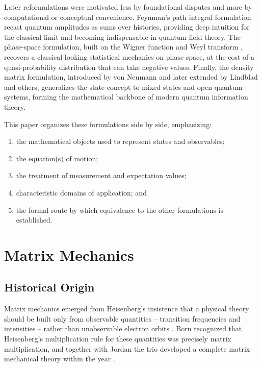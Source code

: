 \documentclass[11pt,a4paper]{article}
\begin{document}
Later reformulations were motivated less by foundational disputes and more by computational or conceptual convenience. Feynman's path integral formulation \citep{feynman1948} recast quantum amplitudes as sums over histories, providing deep intuition for the classical limit and becoming indispensable in quantum field theory. The phase-space formulation, built on the Wigner function \citep{wigner1932} and Weyl transform \citep{weyl1927}, recovers a classical-looking statistical mechanics on phase space, at the cost of a quasi-probability distribution that can take negative values. Finally, the density matrix formulation, introduced by von Neumann and later extended by Lindblad and others, generalizes the state concept to mixed states and open quantum systems, forming the mathematical backbone of modern quantum information theory.

This paper organizes these formulations side by side, emphasizing:
\begin{enumerate}[label=(\roman*)]
    \item the mathematical objects used to represent states and observables;
    \item the equation(s) of motion;
    \item the treatment of measurement and expectation values;
    \item characteristic domains of application; and
    \item the formal route by which equivalence to the other formulations is established.
\end{enumerate}

\section{Matrix Mechanics}

\subsection{Historical Origin}

Matrix mechanics emerged from Heisenberg's insistence that a physical theory should be built only from observable quantities -- transition frequencies and intensities -- rather than unobservable electron orbits \citep{heisenberg1925}. Born recognized that Heisenberg's multiplication rule for these quantities was precisely matrix multiplication, and together with Jordan the trio developed a complete matrix-mechanical theory within the year \citep{born1925}.
\end{document}

